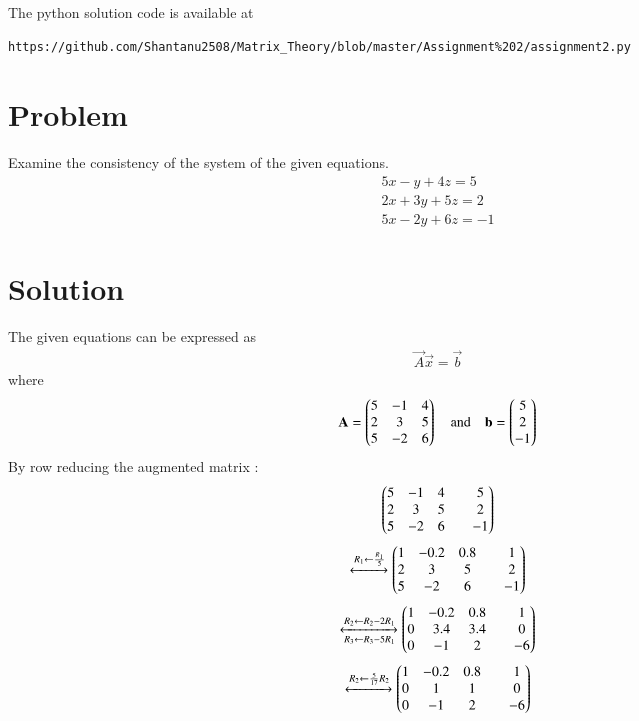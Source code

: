 \documentclass[journal,12pt,twocolumn]{IEEEtran}
\begin{document}
The python solution code is available at
\begin{lstlisting}
https://github.com/Shantanu2508/Matrix_Theory/blob/master/Assignment%202/assignment2.py
\end{lstlisting}
%
\section{Problem}
Examine the consistency of the system of the given equations.
\begin{align}
	5x -  y + 4z = 5 \nonumber \\
	2x + 3y + 5z = 2 \\
	5x - 2y + 6z =-1 \nonumber
\end{align}
\section{Solution}
	The given equations can be expressed as
\begin{align}
	\vec{A} \vec{x} = \vec{b}  
\end{align}
where
\begin{align}
	\mathbf{A} = \begin{pmatrix} 5 & -1 & 4 \\ 2 &  3 & 5 \\ 5 & -2 & 6 \end{pmatrix}
	\quad \text{and} \quad
	\mathbf{b} = \begin{pmatrix} 5 \\  2 \\ -1\end{pmatrix}
\end{align}
By row reducing the augmented matrix :
\begin{align}
	\begin{pmatrix} 5 & -1 & 4 & & 5 \\ 2 & 3 & 5 & & 2 \\ 5 & -2 & 6 & & -1\end{pmatrix}
\end{align}
\begin{align}
    \xleftrightarrow[]{R_1 \leftarrow \frac{R_1}{5}}
	\begin{pmatrix}1 & -0.2  & 0.8  & & 1 \\ 
	       2 & 3 & 5 & & 2 \\ 5 & -2 & 6 & & -1\end{pmatrix}
\end{align}
\begin{align}
	\xleftrightarrow[ R_3 \leftarrow R_3-5R_1]{R_2 \leftarrow R_2-2R_1}
	\begin{pmatrix}1 & -0.2 & 0.8 & & 1 \\ 
	       0 & 3.4 & 3.4 & & 0 \\ 0 & -1 & 2 & & -6\end{pmatrix}
\end{align}
\begin{align}
	\xleftrightarrow[]{R_2 \leftarrow \frac{5}{17}R_2}
	\begin{pmatrix}1 & -0.2 & 0.8 & & 1 \\ 
	       0 & 1 & 1 & & 0 \\ 0 & -1 & 2 & & -6\end{pmatrix}
\end{align}
\end{document}
